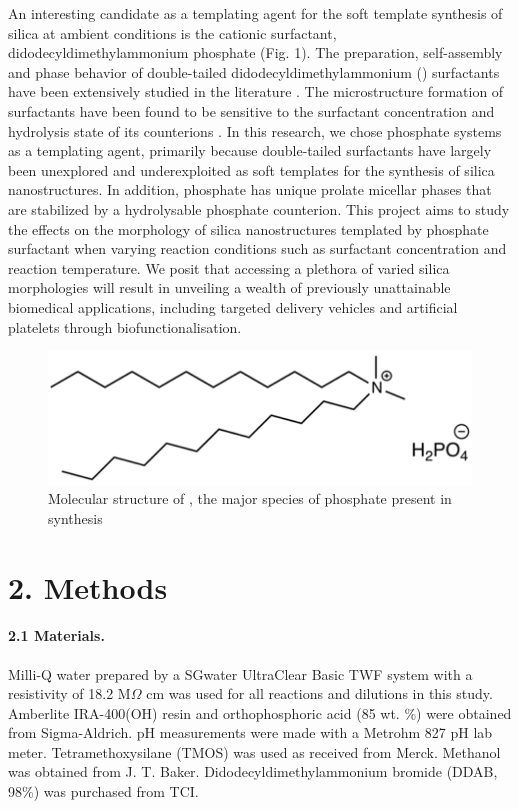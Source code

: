 \documentclass[a4paper,12pt,twocolumn]{article}
\begin{document}
An interesting candidate as a templating agent for the soft template synthesis of silica at ambient conditions is the cationic surfactant, didodecyldimethylammonium phosphate (Fig. 1). The preparation, self-assembly and phase behavior of double-tailed didodecyldimethylammonium () surfactants have been extensively studied in the literature \cite{warr1988}. The microstructure formation of  surfactants have been found to be sensitive to the surfactant concentration and hydrolysis state of its counterions \cite{liu2014}. In this research, we chose  phosphate systems as a templating agent, primarily because double-tailed surfactants have largely been unexplored and underexploited as soft templates for the synthesis of silica nanostructures. In addition,  phosphate has unique prolate micellar phases that are stabilized by a hydrolysable phosphate counterion. This project aims to study the effects on the morphology of silica nanostructures templated by  phosphate surfactant when varying reaction conditions such as surfactant concentration and reaction temperature. We posit that accessing a plethora of varied silica morphologies will result in unveiling a wealth of previously unattainable biomedical applications, including targeted delivery vehicles and artificial platelets through biofunctionalisation.

	\begin{figure}[h!]
		\centering
		\includegraphics[width=0.9\linewidth]{structure.png}
  		\caption{Molecular structure of , the major species of  phosphate present in synthesis}
  		\label{fig:structure}
  	\end{figure}
	 
	 \section{2. Methods}
	 
	 \paragraph{2.1 Materials.} Milli-Q water prepared by a SGwater UltraClear Basic TWF system with a resistivity of 18.2 M$\Omega$ cm was used for all reactions and dilutions in this study. Amberlite IRA-400(OH) resin and orthophosphoric acid (85 wt. \%) were obtained from Sigma-Aldrich. pH measurements were made with a Metrohm 827 pH lab meter. Tetramethoxysilane (TMOS) was used as received from Merck. Methanol was obtained from J. T. Baker. Didodecyldimethylammonium bromide (DDAB, 98\%) was purchased from TCI. 
	 
\end{document}
